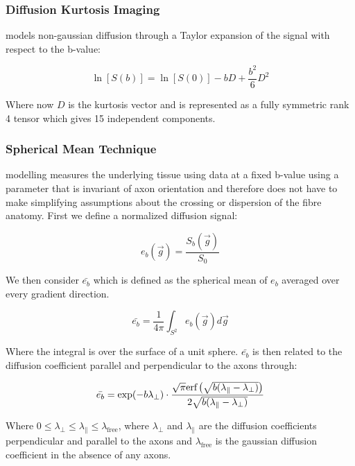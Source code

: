 \subsubsection{Diffusion Kurtosis Imaging}
\dki models non-gaussian diffusion through a Taylor expansion of the signal with respect to the b-value:

\begin{equation}
    \ln[S(b)] = \ln[S(0)] - b D + \frac{b^2}{6} D^2
\end{equation}

Where now $D$ is the kurtosis vector and is represented as a fully symmetric rank 4 tensor which gives 15 independent components. \cite{jensen2005diffusional}

\subsubsection{Spherical Mean Technique}
\smt modelling measures the underlying tissue using data at a fixed b-value using a parameter that is invariant of axon orientation and therefore does not have to make simplifying assumptions about the crossing or dispersion of the fibre anatomy. First we define a normalized diffusion signal:

\begin{equation}
    e_b(\vec{g}) = \frac{S_b(\vec{g})}{S_0}
\end{equation}

We then consider $\bar{e_b}$ which is defined as the spherical mean of $e_b$ averaged over every gradient direction.

\begin{equation}
    \bar{e_b} = \frac{1}{4\pi} \int_{S^2} e_b(\vec{g}) d\vec{g}
\end{equation}

Where the integral is over the surface of a unit sphere. $\bar{e_b}$ is then related to the diffusion coefficient parallel and perpendicular to the axons through:

\begin{equation}
    \bar{e_b} = \exp(-b \lambda_\perp) \cdot
    \frac{\sqrt{\pi}\text{erf} \left(\sqrt{b (\lambda_\parallel - \lambda_\perp)}\right)}
    {2 \sqrt{b (\lambda_\parallel - \lambda_\perp)}}
\end{equation}

Where $0 \leq \lambda_\perp \leq \lambda_\parallel \leq \lambda_\text{free}$, where $\lambda_\perp$ and $\lambda_\parallel$ are the diffusion coefficients perpendicular and parallel to the axons and $\lambda_\text{free}$ is the gaussian diffusion coefficient in the absence of any axons. \cite{kaden2016quantitative}

